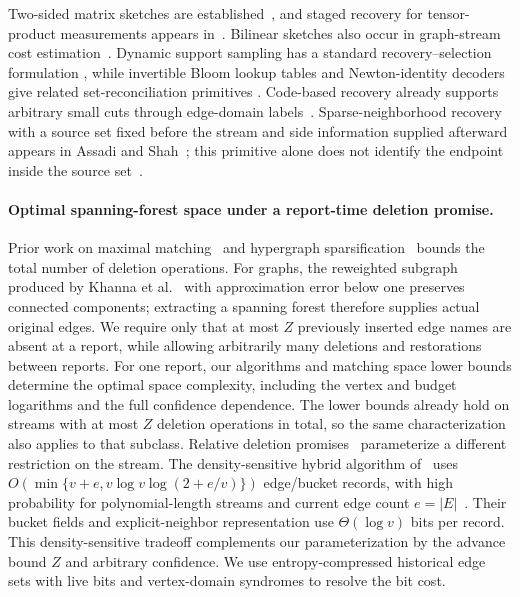 \documentclass[11pt,letterpaper]{article}
\numberwithin{equation}{section}
\begin{document}
Two-sided matrix sketches are established~\cite{DasarathyEtAl2015Tensor}, and staged recovery for tensor-product measurements appears in~\cite[Section~II-B]{HeJoseph2025Hierarchical}.
Bilinear sketches also occur in graph-stream cost estimation~\cite[Section~2.1]{AhnCormodeGuhaMcGregorWirth2015}.
Dynamic support sampling has a standard recovery--selection formulation \cite{CF14}, while invertible Bloom lookup tables and Newton-identity decoders give related set-reconciliation primitives \cite{GoodrichMitzenmacher2011IBLT,EppsteinGoodrich11}.
Code-based recovery already supports arbitrary small cuts through edge-domain labels~\cite[Sections~4.2 and~7.4]{IzumiEmekWadayamaMasuzawa2025}.
Sparse-neighborhood recovery with a source set fixed before the stream and side information supplied afterward appears in Assadi and Shah~\cite[Section~3.2 of the full version]{AssadiShah2022Matching}; this primitive alone does not identify the endpoint inside the source set~\cite[Section~5.2, footnote~10 of the full version]{AssadiShah2022Matching}.
\paragraph{Optimal spanning-forest space under a report-time deletion promise.}
Prior work on maximal matching~\cite{KKD2025} and hypergraph sparsification~\cite{KPS2025} bounds the total number of deletion operations.
For graphs, the reweighted subgraph produced by Khanna et al.~\cite{KPS2025} with approximation error below one preserves connected components; extracting a spanning forest therefore supplies actual original edges.
We require only that at most $Z$ previously inserted edge names are absent at a report, while allowing arbitrarily many deletions and restorations between reports.
For one report, our algorithms and matching space lower bounds determine the optimal space complexity, including the vertex and budget logarithms and the full confidence dependence.
The lower bounds already hold on streams with at most $Z$ deletion operations in total, so the same characterization also applies to that subclass.
Relative deletion promises~\cite{JayaramWoodruff2018} parameterize a different restriction on the stream.
The density-sensitive hybrid algorithm of~\cite{DeManGillBenderDhulipalaTench2026} uses $O(\min\{v+e,v\log v\log(2+e/v)\})$ edge/bucket records, with high probability for polynomial-length streams and current edge count $e=|E|$~\cite[Theorem~1.2]{DeManGillBenderDhulipalaTench2026}.
Their bucket fields and explicit-neighbor representation use $\Theta(\log v)$ bits per record.
This density-sensitive tradeoff complements our parameterization by the advance bound $Z$ and arbitrary confidence.
We use entropy-compressed historical edge sets with live bits and vertex-domain syndromes to resolve the bit cost.
\end{document}
